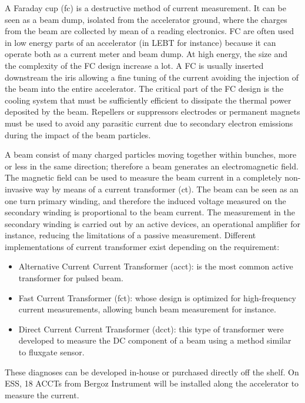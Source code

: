 \begin{refsection}
  A Faraday cup (\acrshort{fc}) is a destructive method of current measurement. It can be seen as a beam dump, isolated from the accelerator ground, where the charges from the beam are collected by mean of a reading electronics. FC are often used in low energy parts of an accelerator (in LEBT for instance) because it can operate both as a current meter and beam dump. At high energy, the size and the complexity of the FC design increase a lot. A FC is usually inserted downstream the iris allowing a fine tuning of the current avoiding the injection of the beam into the entire accelerator. The critical part of the FC design is the cooling system that must be sufficiently efficient to dissipate the thermal power deposited by the beam. Repellers or suppressors electrodes or permanent magnets must be used to avoid any parasitic current due to secondary electron emissions during the impact of the beam particles.

  A beam consist of many charged particles moving together within bunches, more or less in the same direction; therefore a beam generates an electromagnetic field. The magnetic field can be used to measure the beam current in a completely non-invasive way by means of a current transformer (\acrshort{ct}). The beam can be seen as an one turn primary winding, and therefore the induced voltage measured on the secondary winding is proportional to the beam current. The measurement in the secondary winding is carried out by an active devices, an operational amplifier for instance, reducing the limitations of a passive measurement. Different implementations of current transformer exist depending on the requirement:
  \begin{itemize}
    \item Alternative Current Current Transformer (\acrshort{acct}): is the most common active transformer for pulsed beam.
    \item Fast Current Transformer (\acrshort{fct}): whose design is optimized for high-frequency current measurements, allowing bunch beam measurement for instance.
    \item Direct Current Current Transformer (\acrshort{dcct}): this type of transformer were developed to measure the DC component of a beam using a method similar to fluxgate sensor.
  \end{itemize}

  These diagnoses can be developed in-house or purchased directly off the shelf. On ESS, 18 ACCTs from Bergoz Instrument will be installed along the accelerator to measure the current. %


\end{refsection}
